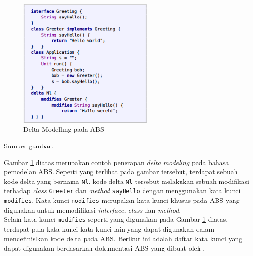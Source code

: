 \begin{figure}
    \centering
    \includegraphics[width=0.6\textwidth]
        {img/delta-modeling-1.png}
    \caption{Delta Modelling pada ABS}
    \label{fig:clarkeDeltaExample}
\end{figure}
\vspace{-0.8cm}

\begin{center}
{\small Sumber gambar: \citep{clarke2012variability}}
\end{center}

Gambar \ref{fig:clarkeDeltaExample} diatas merupakan contoh penerapan \textit{delta modeling} pada bahasa pemodelan ABS. Seperti yang terlihat pada gambar tersebut, terdapat sebuah kode delta yang bernama \texttt{Nl}. kode delta \texttt{Nl} tersebut melakukan sebuah modifikasi terhadap \textit{class} \texttt{Greeter} dan \textit{method} \texttt{sayHello} dengan menggunakan kata kunci \texttt{modifies}. Kata kunci \texttt{modifies} merupakan kata kunci khusus pada ABS yang digunakan untuk memodifikasi \textit{interface, class} dan \textit{method}.\\

Selain kata kunci \texttt{modifies} seperti yang digunakan pada Gambar \ref{fig:clarkeDeltaExample} diatas, terdapat pula kata kunci kata kunci lain yang dapat digunakan dalam mendefinisikan kode delta pada ABS. Berikut ini adalah daftar kata kunci yang dapat digunakan berdasarkan dokumentasi ABS yang dibuat oleh \cite{absref2013}.

